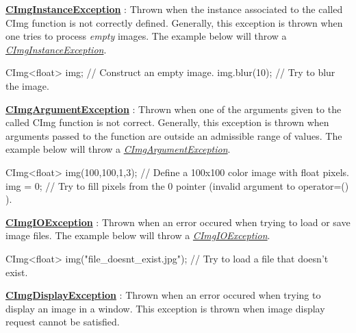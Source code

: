 \begin{DoxyItemize}
\item {\bfseries \hyperlink{structcimg__library_1_1_c_img_instance_exception}{C\-Img\-Instance\-Exception}} \-: Thrown when the instance associated to the called C\-Img function is not correctly defined. Generally, this exception is thrown when one tries to process {\itshape empty} images. The example below will throw a {\itshape \hyperlink{structcimg__library_1_1_c_img_instance_exception}{C\-Img\-Instance\-Exception}}. 
\begin{DoxyCode}
CImg<float> img;        \textcolor{comment}{// Construct an empty image.}
img.blur(10);           \textcolor{comment}{// Try to blur the image.}
\end{DoxyCode}

\item {\bfseries \hyperlink{structcimg__library_1_1_c_img_argument_exception}{C\-Img\-Argument\-Exception}} \-: Thrown when one of the arguments given to the called C\-Img function is not correct. Generally, this exception is thrown when arguments passed to the function are outside an admissible range of values. The example below will throw a {\itshape \hyperlink{structcimg__library_1_1_c_img_argument_exception}{C\-Img\-Argument\-Exception}}. 
\begin{DoxyCode}
CImg<float> img(100,100,1,3);   \textcolor{comment}{// Define a 100x100 color image with float pixels.}
img = 0;                     \textcolor{comment}{// Try to fill pixels from the 0 pointer (invalid argument to operator=() ).}
\end{DoxyCode}

\item {\bfseries \hyperlink{structcimg__library_1_1_c_img_i_o_exception}{C\-Img\-I\-O\-Exception}} \-: Thrown when an error occured when trying to load or save image files. The example below will throw a {\itshape \hyperlink{structcimg__library_1_1_c_img_i_o_exception}{C\-Img\-I\-O\-Exception}}. 
\begin{DoxyCode}
CImg<float> img(\textcolor{stringliteral}{"file\_doesnt\_exist.jpg"});    \textcolor{comment}{// Try to load a file that doesn't exist.}
\end{DoxyCode}

\item {\bfseries \hyperlink{structcimg__library_1_1_c_img_display_exception}{C\-Img\-Display\-Exception}} \-: Thrown when an error occured when trying to display an image in a window. This exception is thrown when image display request cannot be satisfied.
\end{DoxyItemize}

